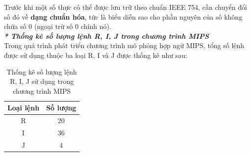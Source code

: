 Trước khi một số thực có thể được lưu trữ theo chuẩn IEEE 754, cần chuyển đổi số đó về \textbf{dạng chuẩn hóa}, tức là biểu diễn sao cho phần nguyên của số không chứa số 0 (ngoại trừ số 0 chính nó).\\

\textbf{\textit{* Thống kê số lượng lệnh R, I, J trong chương trình MIPS}}\\

Trong quá trình phát triển chương trình mô phỏng hợp ngữ MIPS, tổng số lệnh được sử dụng thuộc ba loại R, I và J được thống kê như sau:

\begin{table}[H]
\centering
\begin{tabular}{|c|c|}
\hline
\textbf{Loại lệnh} & \textbf{Số lượng} \\
\hline
R & 20 \\
\hline
I & 36 \\
\hline
J & 4 \\
\hline
\end{tabular}
\caption{Thống kê số lượng lệnh R, I, J sử dụng trong chương trình MIPS}
\end{table}

